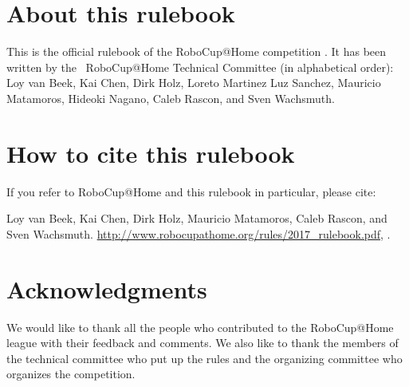 


\section*{About this rulebook}
This is the official rulebook of the RoboCup@Home competition \YEAR.
It has been written by the \YEAR ~RoboCup@Home Technical Committee (in alphabetical order): 
Loy van Beek, 
Kai Chen, 
Dirk Holz,  
Loreto Martinez Luz Sanchez, 
Mauricio Matamoros, 
Hideoki Nagano,
Caleb Rascon, and 
Sven Wachsmuth.

\section*{How to cite this rulebook}
If you refer to RoboCup@Home and this rulebook in particular, please cite:

Loy van Beek, Kai Chen, Dirk Holz, Mauricio Matamoros, Caleb Rascon, and Sven Wachsmuth. 
\url{http://www.robocupathome.org/rules/2017_rulebook.pdf}, \YEAR.



\section*{Acknowledgments}
\label{sec:acknowledgments}


We would like to thank all the people who contributed to the RoboCup@Home league 
with their feedback and comments. 
We also like to thank the members of the technical committee who put up the rules
and the organizing committee who organizes the competition.  

